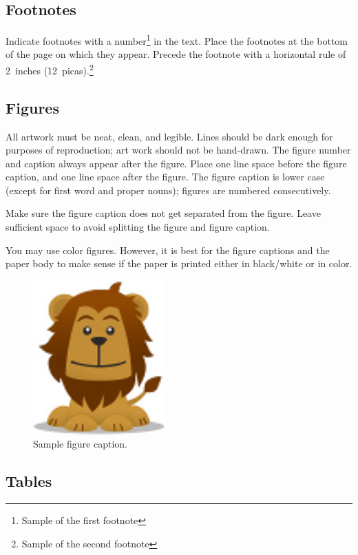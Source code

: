 \documentclass{article} %
\begin{document}
\subsection{Footnotes}

Indicate footnotes with a number\footnote{Sample of the first footnote} in the
text. Place the footnotes at the bottom of the page on which they appear.
Precede the footnote with a horizontal rule of 2~inches
(12~picas).\footnote{Sample of the second footnote}

\subsection{Figures}

All artwork must be neat, clean, and legible. Lines should be dark
enough for purposes of reproduction; art work should not be
hand-drawn. The figure number and caption always appear after the
figure. Place one line space before the figure caption, and one line
space after the figure. The figure caption is lower case (except for
first word and proper nouns); figures are numbered consecutively.

Make sure the figure caption does not get separated from the figure.
Leave sufficient space to avoid splitting the figure and figure caption.

You may use color figures. 
However, it is best for the
figure captions and the paper body to make sense if the paper is printed
either in black/white or in color.
\begin{figure}[h]
\begin{center}
\includegraphics[width=2in]{logo.png}
\end{center}
\caption{Sample figure caption.}
\end{figure}

\subsection{Tables}
\end{document}
